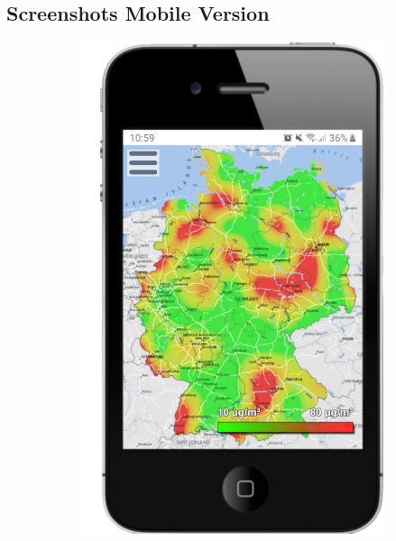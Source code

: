 \subsection{Screenshots Mobile Version}

\begin{figure}[H]
    \begin{subfigure}[c]{0.5\textwidth}
        \centering        
        \includegraphics[scale=0.5]{media/Startseite-Mobile-Version}
    \end{subfigure}
    \begin{subfigure}[c]{0.5\textwidth}
        \centering        

\end{subfigure}
\end{figure}

